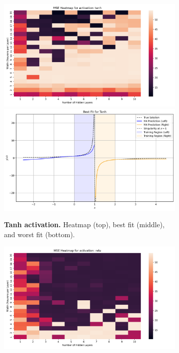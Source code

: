 \begin{figure}[h]
    \centering
    \hspace*{\fill}
    \begin{subfigure}[t]{0.48\textwidth}
        \centering
        \includegraphics[width=\textwidth]{graphics/mse_heatmap_ivp_singularity_tanh.png}
        \includegraphics[width=\textwidth]{graphics/ivp_singularity_best_fit_tanh_7layers_15width.png}
        \caption{\textbf{Tanh activation.} Heatmap (top), best fit (middle), and worst fit (bottom).}
        \label{fig:ivp_periodic_tanh}
    \end{subfigure}
    \hspace*{\fill}
    \begin{subfigure}[t]{0.48\textwidth}
        \centering
        \includegraphics[width=\textwidth]{graphics/mse_heatmap_ivp_singularity_relu.png}

\end{subfigure}
\end{figure}
